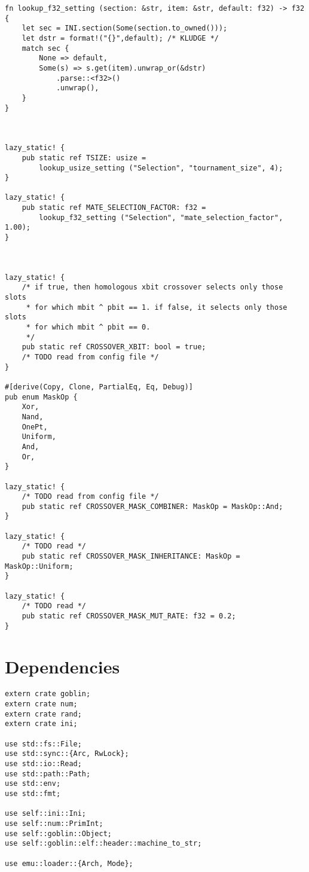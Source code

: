 \documentclass[11pt]{article}
\begin{document}
\begin{lstlisting}
fn lookup_f32_setting (section: &str, item: &str, default: f32) -> f32 {
    let sec = INI.section(Some(section.to_owned()));
    let dstr = format!("{}",default); /* KLUDGE */
    match sec {
        None => default,
        Some(s) => s.get(item).unwrap_or(&dstr)
            .parse::<f32>()
            .unwrap(),
    }
}



lazy_static! {
    pub static ref TSIZE: usize = 
        lookup_usize_setting ("Selection", "tournament_size", 4);
}

lazy_static! {
    pub static ref MATE_SELECTION_FACTOR: f32 =
        lookup_f32_setting ("Selection", "mate_selection_factor", 1.00);
}



lazy_static! {
    /* if true, then homologous xbit crossover selects only those slots
     * for which mbit ^ pbit == 1. if false, it selects only those slots
     * for which mbit ^ pbit == 0.
     */
    pub static ref CROSSOVER_XBIT: bool = true;
    /* TODO read from config file */
}

#[derive(Copy, Clone, PartialEq, Eq, Debug)]
pub enum MaskOp {
    Xor,
    Nand,
    OnePt,
    Uniform,
    And,
    Or,
}

lazy_static! {
    /* TODO read from config file */
    pub static ref CROSSOVER_MASK_COMBINER: MaskOp = MaskOp::And;
}

lazy_static! {
    /* TODO read */
    pub static ref CROSSOVER_MASK_INHERITANCE: MaskOp = MaskOp::Uniform;
} 

lazy_static! {
    /* TODO read */
    pub static ref CROSSOVER_MASK_MUT_RATE: f32 = 0.2;
}
\end{lstlisting}

\section{Dependencies}
\label{sec:org7fecf5a}

\lstset{language=rust,label=org5089f60,caption= ,captionpos=b,numbers=none}
\begin{lstlisting}
extern crate goblin;
extern crate num;
extern crate rand;
extern crate ini;

use std::fs::File;
use std::sync::{Arc, RwLock};
use std::io::Read;
use std::path::Path;
use std::env;
use std::fmt;

use self::ini::Ini;
use self::num::PrimInt;
use self::goblin::Object;
use self::goblin::elf::header::machine_to_str;

use emu::loader::{Arch, Mode};
\end{lstlisting}
\end{document}
